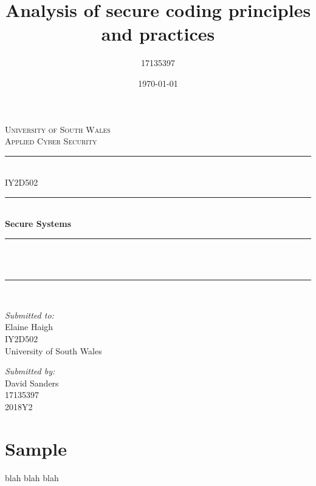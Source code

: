 \documentclass[12pt]{article}
\title{Analysis of secure coding principles and practices}
\author{17135397}
\date{\today}
\makeatletter
\let\thetitle\@title
\makeatother
\begin{document}
\begin{titlepage}
  \centering
  \textsc{\LARGE University of South Wales\\\Large Applied Cyber Security}\\[2cm]

  \rule{\linewidth}{0.2 mm} \\[0.5cm]
  { \huge IY2D502}\\
  \rule{\linewidth}{0.2 mm} \\[0.5cm]
  { \huge \bfseries Secure Systems}\\
  \rule{\linewidth}{0.2 mm} \\[0.5cm]
  \textsc{\Large \thetitle}\\
  \rule{\linewidth}{0.2 mm} \\[2cm]

  \begin{minipage}[t]{0.4\textwidth}
    \begin{flushleft} \large
      \textit{Submitted to:}\\
      Elaine Haigh\\IY2D502\\University of South Wales
    \end{flushleft}
  \end{minipage}
  \begin{minipage}[t]{0.4\textwidth}
    \begin{flushright} \large
      \textit{Submitted by:}\\
      David Sanders\\17135397\\2018Y2
    \end{flushright}
  \end{minipage}
\end{titlepage}



\tableofcontents
\pagebreak



\section{Sample}
blah blah blah
\end{document}
